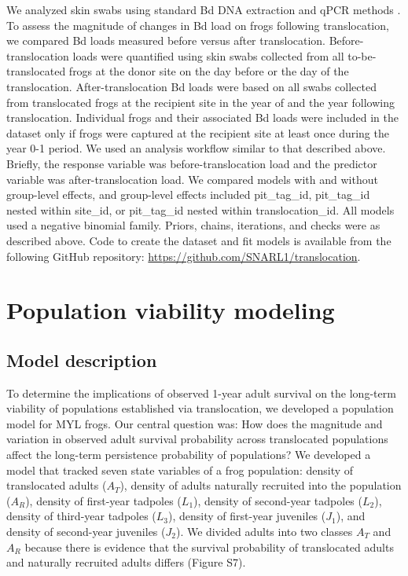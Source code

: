 \documentclass[9pt,twocolumn,twoside,lineno]{pnas-new}
\begin{document}
{We analyzed skin swabs using standard Bd DNA extraction and qPCR methods
\citep[see SI for details]{boyle2004}. To assess the magnitude of
changes in Bd load on frogs following translocation, we compared Bd
loads measured before versus after translocation. Before-translocation
loads were quantified using skin swabs collected from all
to-be-translocated frogs at the donor site on the day before or the day
of the translocation. After-translocation Bd loads were based on all
swabs collected from translocated frogs at the recipient site in the
year of and the year following translocation. Individual frogs and their
associated Bd loads were included in the dataset only if frogs were
captured at the recipient site at least once during the year 0-1 period.
We used an analysis workflow similar to that described above. Briefly,
the response variable was before-translocation load and the predictor
variable was after-translocation load. We compared models with and
without group-level effects, and group-level effects included
pit\_tag\_id, pit\_tag\_id nested within site\_id, or pit\_tag\_id
nested within translocation\_id. All models used a negative binomial
family. Priors, chains, iterations, and checks were as described above.
Code to create the dataset and fit models is available from the
following GitHub repository:
\url{https://github.com/SNARL1/translocation}.

\hypertarget{population-viability-modeling}{%
\section*{Population viability
modeling}\label{population-viability-modeling}}

\hypertarget{model-description}{%
\subsection*{Model description}\label{model-description}}

To determine the implications of observed 1-year adult survival on the
long-term viability of populations established via translocation, we
developed a population model for MYL frogs. Our central question was:
How does the magnitude and variation in observed adult survival
probability across translocated populations affect the long-term
persistence probability of populations? We developed a model that
tracked seven state variables of a frog population: density of
translocated adults (\(A_T\)), density of adults naturally recruited
into the population (\(A_R\)), density of first-year tadpoles (\(L_1\)),
density of second-year tadpoles (\(L_2\)), density of third-year
tadpoles (\(L_3\)), density of first-year juveniles (\(J_1\)), and
density of second-year juveniles (\(J_2\)). We divided adults into two
classes \(A_T\) and \(A_R\) because there is evidence that the survival
probability of translocated adults and naturally recruited adults
differs (Figure S7).

}
\end{document}

